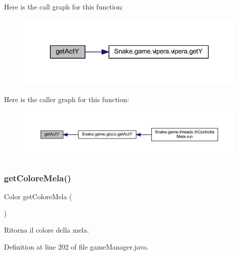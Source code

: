 Here is the call graph for this function\+:
\nopagebreak
\begin{figure}[H]
\begin{center}
\leavevmode
\includegraphics[width=318pt]{class_snake_1_1game_1_1utility_1_1game_manager_ae336e912feaec4a5e82fca472bde7f8f_cgraph}
\end{center}
\end{figure}
Here is the caller graph for this function\+:
\nopagebreak
\begin{figure}[H]
\begin{center}
\leavevmode
\includegraphics[width=350pt]{class_snake_1_1game_1_1utility_1_1game_manager_ae336e912feaec4a5e82fca472bde7f8f_icgraph}
\end{center}
\end{figure}
\mbox{\label{class_snake_1_1game_1_1utility_1_1game_manager_a15fad4646c986312b476543b2f7e547a}} 
\subsubsection{\texorpdfstring{get\+Colore\+Mela()}{getColoreMela()}}
{\footnotesize\ttfamily Color get\+Colore\+Mela (\begin{DoxyParamCaption}{ }\end{DoxyParamCaption})}



Ritorna il colore della mela. 



Definition at line 202 of file game\+Manager.\+java.

